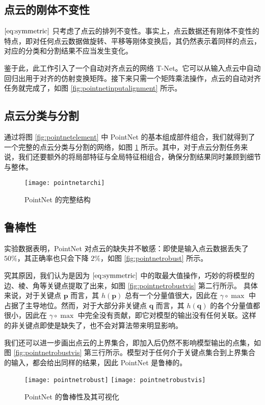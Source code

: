 \subsection{点云的刚体不变性}
$\eqref{eq:symmetric}$ 只考虑了点云的排列不变性。事实上，点云数据还有刚体不变性的特点，即对任何点云数据做旋转、平移等刚体变换后，其仍然表示着同样的点云，对应的分类和分割结果不应当发生变化。

鉴于此，此工作引入了一个自动对齐点云的网络 T-Net。它可以从输入点云中自动回归出用于对齐的仿射变换矩阵。接下来只需一个矩阵乘法操作，点云的自动对齐任务就完成了，如图 \ref{fig:pointnetinputalignment} 所示。


\subsection{点云分类与分割}
通过将图 \ref{fig:pointnetelement} 中 PointNet 的基本组成部件组合，我们就得到了一个完整的点云分类与分割的网络，如图 \ref{fig:pointnetarchi}  所示。其中，对于点云分割任务来说，我们还要额外的将局部特征与全局特征相组合，确保分割结果同时兼顾到细节与整体。
\begin{figure}[h]
	\centering%
	{\texttt{[image: pointnetarchi]}}
	\caption{PointNet\cite{pointnet}  的完整结构}
	\label{fig:pointnetarchi}
\end{figure}

\subsection{鲁棒性 \label{pointnet-robust}}
实验数据表明，PointNet 对点云的缺失并不敏感：即使是输入点云数据丢失了 $50\%$，其正确率也只会下降 $2\%$，如图 \ref{fig:pointnetrobust} 所示。

究其原因，我们认为是因为 $\eqref{eq:symmetric}$ 中的取最大值操作，巧妙的将模型的边、棱、角等关键点提取了出来，如图 \ref{fig:pointnetrobustvis} 第二行所示。
具体来说，对于关键点 $\bm p$ 而言，其 $h(\bm p)$ 总有一个分量值很大，因此在 $\gamma \circ \max$ 中占据了主导地位。然而，对于大部分非关键点 $\bm q$ 而言，其 $h(\bm q)$ 的各个分量值都很小，因此在 $\gamma \circ \max$ 中完全没有贡献，即它对模型的输出没有任何关联。这样的非关键点即使是缺失了，也不会对算法带来明显影响。

我们还可以进一步画出点云的上界集合，即加入后仍然不影响模型输出的点集，如图 \ref{fig:pointnetrobustvis} 第三行所示。模型对于任何介于关键点集合到上界集合的输入，都会给出同样的结果，因此 PointNet 是鲁棒的。


\begin{figure}[h]
	\centering%
	{\texttt{[image: pointnetrobust]}}%
	\hspace{2em}%
	{\texttt{[image: pointnetrobustvis]}}
	\caption{PointNet\cite{pointnet}  的鲁棒性及其可视化}
\end{figure}

